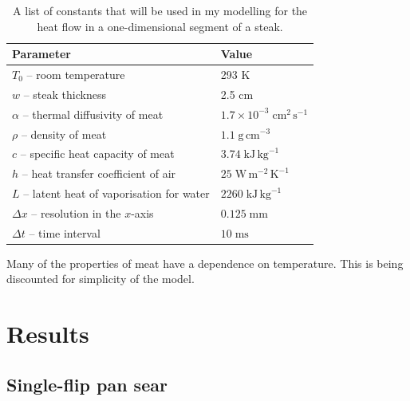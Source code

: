 \documentclass[11pt]{article}
\begin{document}
	\begin{table}[H]
		\centering
		\begin{tabular}{ll}
			\hline
			\textbf{Parameter} & \textbf{Value} \\
			\hline
			$T_0$ -- room temperature & 293 K\\
			$w$ -- steak thickness & 2.5 cm\\
			$\alpha$ -- thermal diffusivity of meat & $1.7 \times 10^{-3}\;\text{cm}^2\,\text{s}^{-1}$\cite{meat_diffusivity}\\
			$\rho$ -- density of meat & $1.1\;\mathrm{g}\,\mathrm{cm}^{-3}$\cite{steak_modelling} \\
			$c$ -- specific heat capacity of meat & $3.74\;\text{kJ}\,\text{kg}^{-1}$ \cite{steak_modelling} \\
			$h$ -- heat transfer coefficient of air & $25\;\mathrm{W}\,\mathrm{m}^{-2}\,\mathrm{K}^{-1}$\cite{heat_transfer_coeff}\\
			$L$ -- latent heat of vaporisation for water & $2260\;\text{kJ}\,\mathrm{kg}^{-1}$ \cite{water} \\
			$\Delta x$ -- resolution in the $x$-axis & $0.125\;\mathrm{mm}$\\
			$\Delta t$ -- time interval & $10\;\mathrm{ms}$\\
		\end{tabular}
		\caption{A list of constants that will be used in my modelling for the heat flow in a one-dimensional segment of a steak.}
		\label{tab:params}
	\end{table}
	
	Many of the properties of meat have a dependence on temperature. This is being discounted for simplicity of the model.
	
	\section{Results}
	
	\subsection{Single-flip pan sear}
	
\end{document}
